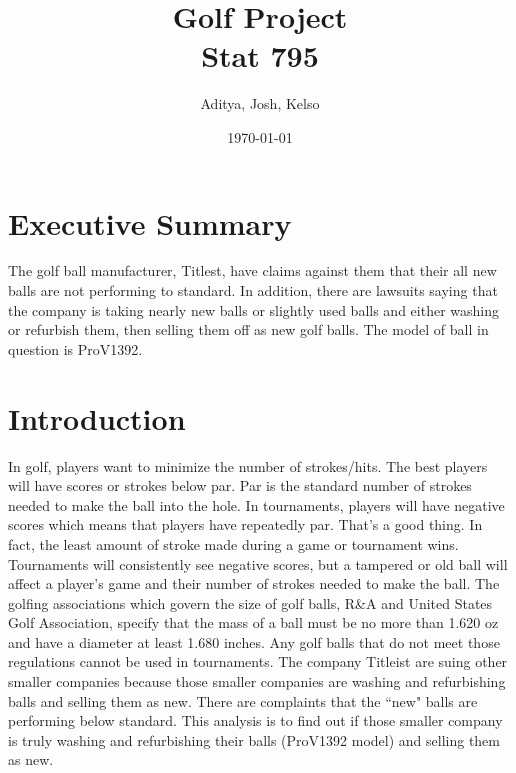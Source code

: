 \documentclass{article}\usepackage[]{graphicx}\usepackage[]{color}
\title{Golf Project \\
\large Stat 795}
\author{Aditya, Josh, Kelso}
\date{\today}
\makeatletter
\newenvironment{kframe}{%
 \def\at@end@of@kframe{}%
 \ifinner\ifhmode%
  \def\at@end@of@kframe{\end{minipage}}%
  \begin{minipage}{\columnwidth}%
 \fi\fi%
 \def\FrameCommand##1{\hskip\@totalleftmargin \hskip-\fboxsep
 \colorbox{shadecolor}{##1}\hskip-\fboxsep
     \hskip-\linewidth \hskip-\@totalleftmargin \hskip\columnwidth}%
 \MakeFramed {\advance\hsize-\width
   \@totalleftmargin\z@ \linewidth\hsize
   \@setminipage}}%
 {\par\unskip\endMakeFramed%
 \at@end@of@kframe}
\newenvironment{knitrout}{}{} %
\newcommand{\doublespacing}{\let\CS=\@currsize\renewcommand{
		\baselinestretch}{1.2}\small\CS}
\makeatother
\begin{document}
 
\maketitle



\begin{knitrout}
\color{fgcolor}\begin{kframe}


{\ttfamily\noindent\itshape\color{messagecolor}{\#\# Loading required package: bitops}}\end{kframe}
\end{knitrout}
\doublespacing


\section*{Executive Summary}


The golf ball manufacturer, Titlest, have claims against them that their all new balls are not performing to standard. In addition, there are lawsuits saying that the company is taking nearly new balls or slightly used balls and either washing or refurbish them, then selling them off as new golf balls. The model of ball in question is ProV1392. 

\section*{Introduction}

In golf, players want to minimize the number of strokes/hits. The best players will have scores or strokes below par. Par is the standard number of strokes needed to make the ball into the hole. In tournaments, players will have negative scores which means that players have repeatedly par. That’s a good thing. In fact, the least amount of stroke made during a game or tournament wins. Tournaments will consistently see negative scores, but a tampered or old ball will affect a player’s game and their number of strokes needed to make the ball.   
The golfing associations which govern the size of golf balls, R\&A and United States Golf Association, specify that the mass of a ball must be no more than 1.620 oz and have a diameter at least 1.680 inches. Any golf balls that do not meet those regulations cannot be used in tournaments. The company Titleist are suing other smaller companies because those smaller companies are washing and refurbishing balls and selling them as new. There are complaints that the ``new" balls are performing below standard. This analysis is to find out if those smaller company is truly washing and refurbishing their balls (ProV1392 model) and selling them as new. 
\end{document}
